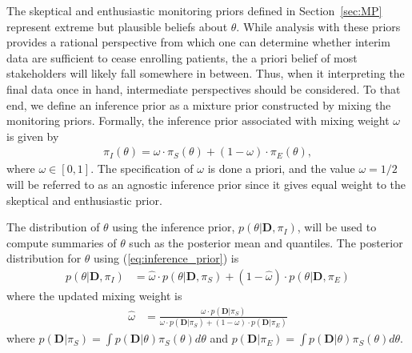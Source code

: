 \documentclass[12pt]{article}
\begin{document}
The skeptical and enthusiastic monitoring priors defined in Section~\ref{sec:MP} represent extreme but plausible beliefs about $\theta$.
%
While analysis with these priors provides a rational perspective from which one can determine whether interim data are sufficient 
to cease enrolling patients, the a priori belief of most stakeholders will likely fall somewhere in between.
%
Thus, when it interpreting the final data once in hand, intermediate perspectives should be considered.
%
To that end, we define an inference prior as a mixture prior constructed by mixing the monitoring priors.
%
Formally, the inference prior associated with mixing weight $\omega$ is given by
\begin{align}\label{eq:inference_prior}
\pi_{I}\left(\theta\right)=\omega\cdot\pi_{S}\left(\theta\right)+(1-\omega) \cdot \pi_E\left(\theta\right),
\end{align}
where $\omega\in[0,1]$. 
%
The specification of $\omega$ is done a priori, and the value $\omega=1/2$ will be referred to as an agnostic inference prior since it gives equal weight to the skeptical and enthusiastic prior.
%

The distribution of $\theta$ using the inference 
prior, $p(\theta|\mathbf{D},\pi_I)$, will be used to compute summaries of $\theta$ such as the posterior mean and quantiles. The posterior distribution for $\theta$ using (\ref{eq:inference_prior}) is
\begin{align}
p(\theta|\mathbf{D},\pi_I)&=\hat{\omega}\cdot p(\theta|\mathbf{D},\pi_S)+(1-\hat{\omega})\cdot p(\theta|\mathbf{D},\pi_E)
\end{align}
where the updated mixing weight is
\begin{align}
\hat{\omega}&=\frac{\omega\cdot p(\mathbf{D}|\pi_S)}{\omega\cdot p(\mathbf{D}|\pi_S)+(1-\omega)\cdot p(\mathbf{D}|\pi_E)}
\end{align}
where $p(\mathbf{D}|\pi_S)=\int p(\mathbf{D}|\theta)\pi_S(\theta)d\theta$ and $p(\mathbf{D}|\pi_E)=\int p(\mathbf{D}|\theta)\pi_S(\theta)d\theta$. 
\end{document}
